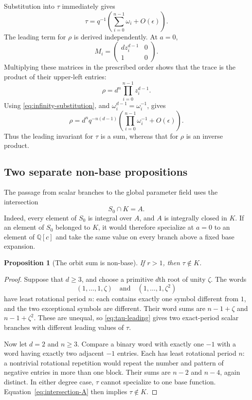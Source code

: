 \documentclass[11pt]{article}
\newtheorem{proposition}[theorem]{Proposition}
\theoremstyle{definition}
\theoremstyle{remark}
\newcommand{\Q}{\mathbb{Q}}
\begin{document}
Substitution into $\tau$ immediately gives
\begin{equation}\label{eq:tau-leading}
 \tau=q^{-1}\left(\sum_{i=0}^{n-1}\omega_i+O(\epsilon)\right).
\end{equation}
The leading term for $\rho$ is derived independently.  At $a=0$,
\[
 M_i=\begin{pmatrix}d z_i^{d-1}&0\\1&0\end{pmatrix}.
\]
Multiplying these matrices in the prescribed order shows that the trace is
the product of their upper-left entries:
\[
 \rho=d^n\prod_{i=0}^{n-1}z_i^{d-1}.
\]
Using \eqref{eq:infinity-substitution}, and
$\omega_i^{d-1}=\omega_i^{-1}$, gives
\begin{equation}\label{eq:rho-leading}
 \rho=d^nq^{-n(d-1)}
 \left(\prod_{i=0}^{n-1}\omega_i^{-1}+O(\epsilon)\right).
\end{equation}
Thus the leading invariant for $\tau$ is a sum, whereas that for $\rho$ is
an inverse product.

\subsection{Two separate non-base propositions}

The passage from scalar branches to the global parameter field uses the
intersection
\begin{equation}\label{eq:intersection-A}
 S_0\cap K=A.
\end{equation}
Indeed, every element of $S_0$ is integral over $A$, and $A$ is integrally
closed in $K$.  If an element of $S_0$ belonged to $K$, it would therefore
specialize at $a=0$ to an element of $\Q[c]$ and take the same value on every
branch above a fixed base expansion.

\begin{proposition}[The orbit sum is non-base]\label{prop:tau-nonbase}
If $r>1$, then $\tau\notin K$.
\end{proposition}

\begin{proof}
Suppose that $d\geq3$, and choose a primitive $d$th root of unity
$\zeta$.  The words
\[
 (1,\ldots,1,\zeta)
 \quad\text{and}\quad
 (1,\ldots,1,\zeta^2)
\]
have least rotational period $n$: each contains exactly one symbol different
from $1$, and the two exceptional symbols are different.  Their word sums
are $n-1+\zeta$ and $n-1+\zeta^2$.  These are unequal, so
\eqref{eq:tau-leading} gives two exact-period scalar branches with different
leading values of $\tau$.

Now let $d=2$ and $n\geq3$.  Compare a binary word with exactly one $-1$
with a word having exactly two adjacent $-1$ entries.  Each has least
rotational period $n$: a nontrivial rotational repetition would repeat the
number and pattern of negative entries in more than one block.  Their sums
are $n-2$ and $n-4$, again distinct.  In either degree case, $\tau$ cannot
specialize to one base function.  Equation~\eqref{eq:intersection-A} then
implies $\tau\notin K$.
\end{proof}
\end{document}

